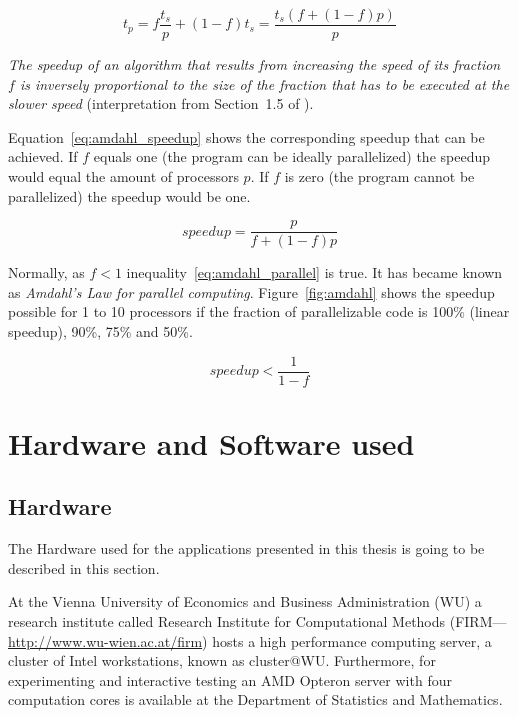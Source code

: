 \begin{description}
\begin{description}
\begin{equation}
\label{eq:t_amdahl}
t_p = f \frac{t_s}{p} + (1 - f) t_s = \frac{t_s ( f + ( 1 - f) p )}{p}
\end{equation}

\textit{The speedup of an algorithm that results from increasing the speed of
its fraction $f$ is inversely proportional to the size of the fraction
that has to be executed at the slower speed} (interpretation from
Section~1.5 of \cite{kontoghiorghes06handbookpcstat}).

Equation~\ref{eq:amdahl_speedup} shows the corresponding speedup that
can be achieved. If $f$ equals one (the program can be ideally
parallelized) the speedup would equal the amount of processors $p$. If
$f$ is zero (the program cannot be parallelized) the speedup would be
one. 

\begin{equation}
\label{eq:amdahl_speedup}
speedup = \frac{p}{f + (1 - f)p}
\end{equation}

Normally, as $f < 1$ inequality~\ref{eq:amdahl_parallel} is true. It
has became known as \textit{Amdahl's Law for parallel
  computing}. Figure~\ref{fig:amdahl} shows the speedup possible for 1
to 10 processors if
the fraction of parallelizable code is 100\% (linear speedup), 90\%,
75\% and 50\%.

\begin{equation}
\label{eq:amdahl_parallel}
speedup < \frac{1}{1 - f}
\end{equation}





\section{Hardware and Software used}
\label{sec:hardwaresoftware}

\subsection{Hardware}
The Hardware used for the applications presented in this thesis is
going to be described in this section.

At the Vienna University of Economics and Business Administration (WU)
a research institute called Research Institute for Computational
Methods (FIRM---\url{http://www.wu-wien.ac.at/firm}) hosts a high
performance computing server, a cluster of Intel workstations, known
as cluster@WU.
Furthermore, for experimenting and interactive testing an AMD Opteron
server with four computation cores is available at the
Department of Statistics and Mathematics. 


\end{description}
\end{description}
